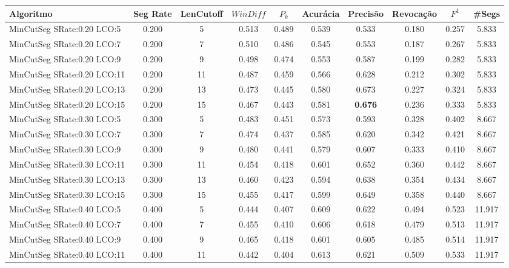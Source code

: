 \documentclass{article}
\begin{document}
\newpage
\begin{longtable}[c]{|l|c|c|c|c|c|c|c|c|c|} 
\hline 
Algoritmo & Seg Rate & LenCutoff & $WinDiff$ & $P_k$ & Acurácia & Precisão & Revocação & $F^1$ & \#Segs\\ \hline 
MinCutSeg SRate:0.20 LCO:5 & 0.200 & 5 & 0.513 & 0.489 & 0.539 & 0.533 & 0.180 & 0.257 & 5.833  \\ \hline 
 MinCutSeg SRate:0.20 LCO:7 & 0.200 & 7 & 0.510 & 0.486 & 0.545 & 0.553 & 0.187 & 0.267 & 5.833  \\ \hline 
 MinCutSeg SRate:0.20 LCO:9 & 0.200 & 9 & 0.498 & 0.474 & 0.553 & 0.587 & 0.199 & 0.282 & 5.833  \\ \hline 
 MinCutSeg SRate:0.20 LCO:11 & 0.200 & 11 & 0.487 & 0.459 & 0.566 & 0.628 & 0.212 & 0.302 & 5.833  \\ \hline 
 MinCutSeg SRate:0.20 LCO:13 & 0.200 & 13 & 0.473 & 0.445 & 0.580 & 0.673 & 0.227 & 0.324 & 5.833  \\ \hline 
 MinCutSeg SRate:0.20 LCO:15 & 0.200 & 15 & 0.467 & 0.443 & 0.581 & \cellcolor{gray!20} \textbf{0.676} & 0.236 & 0.333 & 5.833  \\ \hline 
 MinCutSeg SRate:0.30 LCO:5 & 0.300 & 5 & 0.483 & 0.451 & 0.573 & 0.593 & 0.328 & 0.402 & 8.667  \\ \hline 
 MinCutSeg SRate:0.30 LCO:7 & 0.300 & 7 & 0.474 & 0.437 & 0.585 & 0.620 & 0.342 & 0.421 & 8.667  \\ \hline 
 MinCutSeg SRate:0.30 LCO:9 & 0.300 & 9 & 0.480 & 0.441 & 0.579 & 0.607 & 0.333 & 0.410 & 8.667  \\ \hline 
 MinCutSeg SRate:0.30 LCO:11 & 0.300 & 11 & 0.454 & 0.418 & 0.601 & 0.652 & 0.360 & 0.442 & 8.667  \\ \hline 
 MinCutSeg SRate:0.30 LCO:13 & 0.300 & 13 & 0.460 & 0.423 & 0.594 & 0.638 & 0.354 & 0.434 & 8.667  \\ \hline 
 MinCutSeg SRate:0.30 LCO:15 & 0.300 & 15 & 0.455 & 0.417 & 0.599 & 0.649 & 0.358 & 0.440 & 8.667  \\ \hline 
 MinCutSeg SRate:0.40 LCO:5 & 0.400 & 5 & 0.444 & 0.407 & 0.609 & 0.622 & 0.494 & 0.523 & 11.917  \\ \hline 
 MinCutSeg SRate:0.40 LCO:7 & 0.400 & 7 & 0.455 & 0.410 & 0.606 & 0.618 & 0.479 & 0.513 & 11.917  \\ \hline 
 MinCutSeg SRate:0.40 LCO:9 & 0.400 & 9 & 0.465 & 0.418 & 0.601 & 0.605 & 0.485 & 0.514 & 11.917  \\ \hline 
 MinCutSeg SRate:0.40 LCO:11 & 0.400 & 11 & 0.442 & 0.404 & 0.613 & 0.621 & 0.509 & 0.533 & 11.917  \\ \hline 

\end{longtable}
\end{document}
